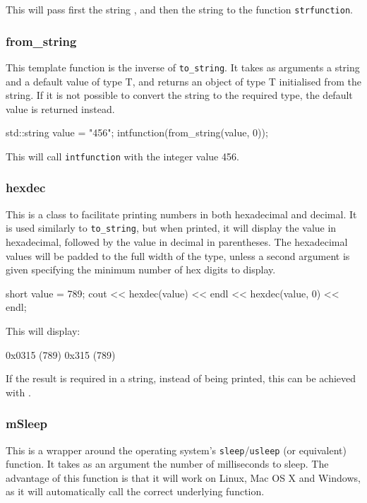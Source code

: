 This will pass first the string ,
and then the string 
to the function \texttt{strfunction}.

\subsubsection{from\_string}
This template function is the inverse of \texttt{to\_string}.
It takes as arguments a string and a default value of type T,
and returns an object of type T initialised from the string.
If it is not possible to convert the string to the required type,
the default value is returned instead.
\begin{listing}
std::string value = "456";
intfunction(from_string(value, 0));
\end{listing}

This will call \texttt{intfunction} with the integer value 456.

\subsubsection{hexdec}
This is a class to facilitate printing numbers in both hexadecimal and decimal.
It is used similarly to \texttt{to\_string}, but when printed,
it will display the value in hexadecimal, followed by the value in decimal in parentheses.
The hexadecimal values will be padded to the full width of the type,
unless a second argument is given specifying the minimum number of hex digits to display.
\begin{listing}
short value = 789;
cout << hexdec(value) << endl
     << hexdec(value, 0) << endl;
\end{listing}

This will display:
\begin{listing}[]
0x0315 (789)
0x315 (789)
\end{listing}

If the result is required in a string, instead of being printed,
this can be achieved with .

\subsubsection{mSleep}\label{sec:mSleep}
This is a wrapper around the operating system's \texttt{sleep}/\texttt{usleep}
(or equivalent) function.
It takes as an argument the number of milliseconds to sleep.
The advantage of this function is that it will work on Linux,
Mac OS X and Windows, as it will automatically call the correct underlying function.

